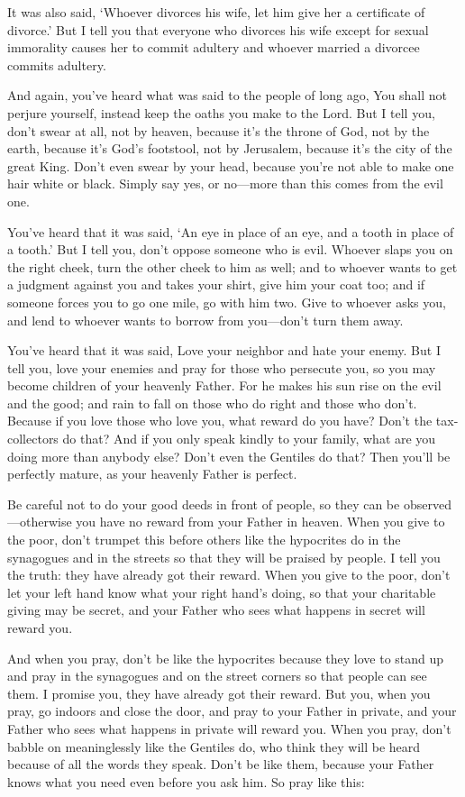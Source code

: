 \documentclass[a4paper]{amsbook}
\begin{document}
It was also said, ‘Whoever divorces his wife, let him give her a certificate of divorce.' But I tell you that everyone who divorces his wife except for sexual immorality causes her to commit adultery and whoever married a divorcee commits adultery.

And again, you've heard what was said to the people of long ago, You shall not perjure yourself, instead keep the oaths you make to the Lord. But I tell you, don't swear at all, not by heaven, because it's the throne of God, not by the earth, because it's God's footstool, not by Jerusalem, because it's the city of the great King. Don't even swear by your head, because you're not able to make one hair white or black. Simply say yes, or no—more than this comes from the evil one.

You've heard that it was said, ‘An eye in place of an eye, and a tooth in place of a tooth.' But I tell you, don't oppose someone who is evil. Whoever slaps you on the right cheek, turn the other cheek to him as well; and to whoever wants to get a judgment against you and takes your shirt, give him your coat too; and if someone forces you to go one mile, go with him two. Give to whoever asks you, and lend to whoever wants to borrow from you—don't turn them away.

You've heard that it was said, Love your neighbor and hate your enemy. But I tell you, love your enemies and pray for those who persecute you, so you may become children of your heavenly Father. For he makes his sun rise on the evil and the good; and rain to fall on those who do right and those who don't. Because if you love those who love you, what reward do you have? Don't the tax-collectors do that? And if you only speak kindly to your family, what are you doing more than anybody else? Don't even the Gentiles do that? Then you'll be perfectly mature, as your heavenly Father is perfect.

Be careful not to do your good deeds in front of people, so they can be observed—otherwise you have no reward from your Father in heaven. When you give to the poor, don't trumpet this before others like the hypocrites do in the synagogues and in the streets so that they will be praised by people. I tell you the truth: they have already got their reward. When you give to the poor, don't let your left hand know what your right hand's doing, so that your charitable giving may be secret, and your Father who sees what happens in secret will reward you.

And when you pray, don't be like the hypocrites because they love to stand up and pray in the synagogues and on the street corners so that people can see them. I promise you, they have already got their reward. But you, when you pray, go indoors and close the door, and pray to your Father in private, and your Father who sees what happens in private will reward you. When you pray, don't babble on meaninglessly like the Gentiles do, who think they will be heard because of all the words they speak. Don't be like them, because your Father knows what you need even before you ask him. So pray like this:
\end{document}

